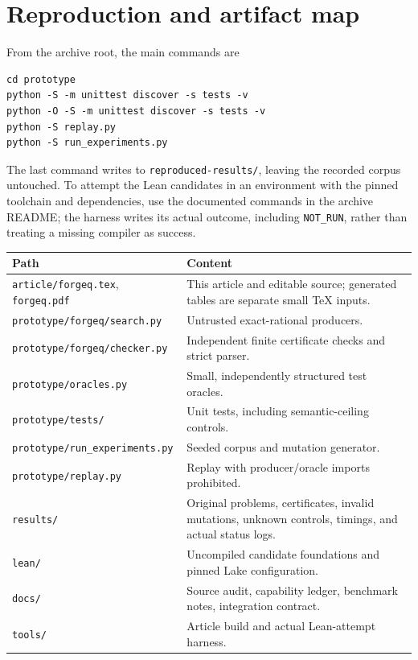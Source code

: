 \documentclass[11pt,letterpaper]{article}
\theoremstyle{definition}\newtheorem{definition}[theorem]{Definition}
\theoremstyle{remark}\newtheorem{remark}[theorem]{Remark}
\newcommand{\code}[1]{\texttt{#1}}
\begin{document}
\appendix
\section{Reproduction and artifact map}
From the archive root, the main commands are
\begin{lstlisting}
cd prototype
python -S -m unittest discover -s tests -v
python -O -S -m unittest discover -s tests -v
python -S replay.py
python -S run_experiments.py
\end{lstlisting}
The last command writes to \code{reproduced-results/}, leaving the recorded corpus untouched. To attempt the Lean candidates in an environment with the pinned toolchain and dependencies, use the documented commands in the archive README; the harness writes its actual outcome, including \code{NOT\_RUN}, rather than treating a missing compiler as success.

\begin{longtable}{@{}L{0.35\textwidth}L{0.59\textwidth}@{}}
\toprule Path & Content\\\midrule\endhead
\code{article/forgeq.tex}, \code{forgeq.pdf} & This article and editable source; generated tables are separate small TeX inputs.\\
\code{prototype/forgeq/search.py} & Untrusted exact-rational producers.\\
\code{prototype/forgeq/checker.py} & Independent finite certificate checks and strict parser.\\
\code{prototype/oracles.py} & Small, independently structured test oracles.\\
\code{prototype/tests/} & Unit tests, including semantic-ceiling controls.\\
\code{prototype/run\_experiments.py} & Seeded corpus and mutation generator.\\
\code{prototype/replay.py} & Replay with producer/oracle imports prohibited.\\
\code{results/} & Original problems, certificates, invalid mutations, unknown controls, timings, and actual status logs.\\
\code{lean/} & Uncompiled candidate foundations and pinned Lake configuration.\\
\code{docs/} & Source audit, capability ledger, benchmark notes, integration contract.\\
\code{tools/} & Article build and actual Lean-attempt harness.\\\bottomrule
\end{longtable}
\end{document}

